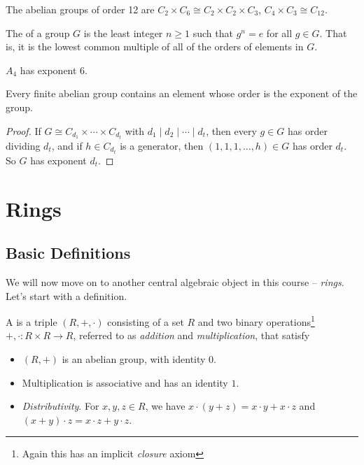 \documentclass[a4paper]{scrartcl}
\begin{document}
\begin{example}
	The abelian groups of order 12 are $C_{2} \times C_6 \cong C_2 \times C_2 \times C_3$, $C_4 \times C_3 \cong C_{12}$.
\end{example}

\begin{definition}[Exponent]
	The  of a group $G$ is the least integer $n \geq 1$ such that $g^n = e$ for all $g \in G$. That is, it is the lowest common multiple of all of the orders of elements in $G$.
\end{definition}

\begin{example}
	$A_4$ has exponent 6.
\end{example}

\begin{corollary}
	Every finite abelian group contains an element whose order is the exponent of the group.
\end{corollary}
\begin{proof}
	If $G \cong C_{d_1} \times \cdots \times C_{d_t}$ with $d_1 \mid d_2 \mid \cdots \mid d_t$, then every $g \in G$ has order dividing $d_t$, and if $h \in C_{d_t}$ is a generator, then $(1, 1, 1, \dots, h) \in G$ has order $d_t$. So $G$ has exponent $d_t$.
\end{proof}


\section{Rings} 

\subsection{Basic Definitions}



We will now move on to another central algebraic object in this course -- \emph{rings}.
Let's start with a definition.


\begin{definition}[Ring]
	A  is a triple $(R, +, \cdot)$ consisting of a set $R$ and two binary operations\footnote{Again this has an implicit \emph{closure} axiom} $+, \cdot: R \times R \rightarrow R$, referred to as \emph{addition} and \emph{multiplication}, that satisfy
	\begin{itemize}
		\item $(R, +)$ is an abelian group, with identity $0$.
		\item Multiplication is associative and has an identity $1$.
		\item \emph{Distributivity}. For $x, y, z \in R$, we have $x \cdot (y + z) = x \cdot y + x \cdot z$ and $(x + y)\cdot z = x \cdot z + y \cdot z$.
	\end{itemize}
\end{definition}
\end{document}
